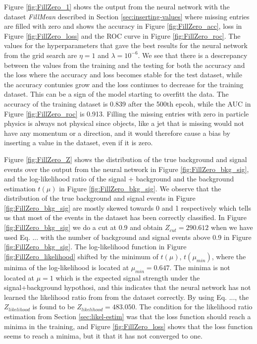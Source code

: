 \documentclass[../../main/main.tex]{subfiles}
\begin{document}
Figure \ref{fig:FillZero_1} shows the output from the neural network with the dataset \emph{FillMean} described in Section \ref{sec:inserting-values} where missing entries are filled with zero and shows the accuracy in Figure \ref{fig:FillZero_acc}, loss in Figure \ref{fig:FillZero_loss} and the ROC curve in Figure \ref{fig:FillZero_roc}. The values for the hyperparameters that gave the best results for the neural network from the grid search are \(\eta=1\) and \(\lambda=10^{-6}\). We see that there is a descrepancy between the values from the training and the testing for both the accuracy and the loss where the accuracy and loss becomes stable for the test dataset, while the accuracy contunies grow and the loss continues to decrease for the training dataset. This can be a sign of the model starting to overfitt the data. The accuracy of the training dataset is 0.839 after the 500th epcoh, while the AUC in Figure \ref{fig:FillZero_roc} is 0.913. Filling the missing entries with zero in particle physics is always not physical since objects, like a jet that is missing would not have any momentum or a direction, and it would therefore cause a bias by inserting a value in the dataset, even if it is zero.

Figure \ref{fig:FillZero_Z} shows the distribution of the true background and signal events over the output from the neural network in Figure \ref{fig:FillZero_bkg_sig}, and the log-likelihood ratio of the signal + background and the background estimation \(t(\mu)\) in Figure \ref{fig:FillZero_bkg_sig}. We observe that the distribution of the true background and signal events in Figure \ref{fig:FillZero_bkg_sig} are mostly skewed towards 0 and 1 respectively which tells us that most of the events in the dataset has been correctly classified. In Figure \ref{fig:FillZero_bkg_sig} we do a cut at 0.9 and obtain \(Z_{cut} = 290.612\) when we have used Eq. ... with the number of background and signal events above 0.9 in Figure \ref{fig:FillZero_bkg_sig}. The log-likelihood function in Figure \ref{fig:FillZero_likelihood}  shifted by the minimum of \(t(\mu)\), \(t(\mu_{min})\), where the minima of the log-likelihood is located at \(\mu_{min} = 0.647\). The minima is not located at \(\mu=1\) which is the expected signal strength under the signal+background hypothosi, and this indicates that the neural network has not learned the likelihood ratio from from the dataset correctly. By using Eq. ..., the \(Z_{likelihood}\) is found to be \(Z_{likelihood} = 483.050\). The condition for the likelihood ratio estimation from Section \ref{sec:likel-estim} was that the loss function should reach a minima in the training, and Figure \ref{fig:FillZero_loss} shows that the loss function seems to reach a minima, but it that it has not converged to one.
\end{document}
